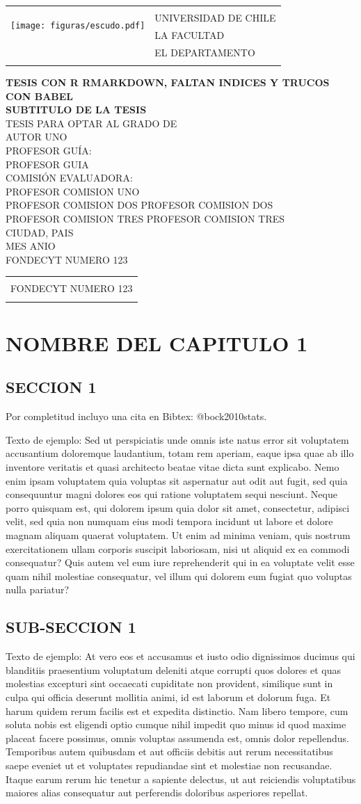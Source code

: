 \documentclass[letterpaper,10pt, openright]{report}
\title{}
\author{}
\date{}
\renewcommand{\maketitle}{%
    \thispagestyle{empty}
    \renewcommand{\baselinestretch}{1}
    \begin{center}
    \begin{tabular}{ll}
        \multirow{3}{*}{\texttt{[image: figuras/escudo.pdf]}}
        &\\
        &\large{\MakeUppercase{Universidad de Chile}}\\
        &\large{\MakeUppercase{LA FACULTAD}}\\
        &\large{\MakeUppercase{EL DEPARTAMENTO}}\\
        &\\
    \end{tabular}
    \end{center}
    \begin{center}
        \vfill
                        {\Large \bfseries \MakeUppercase{TESIS CON R RMARKDOWN, FALTAN INDICES Y TRUCOS CON BABEL}}\\
                                    {\Large  \bfseries \MakeUppercase{SUBTITULO DE LA TESIS}}\\
                    \vskip 0.75cm%
            {\large \MakeUppercase{TESIS PARA OPTAR AL GRADO DE}}\\
        \vfill
            {\large \MakeUppercase{AUTOR UNO}}\\
        \vskip 0.75cm%
            \large\MakeUppercase{Profesor Gu\'ia:}\\
            \large\MakeUppercase{PROFESOR GUIA}\\
        \vskip 0.75cm
                        \large\MakeUppercase{Comisi\'on Evaluadora:}\\
            \large\MakeUppercase{PROFESOR COMISION UNO}\\
                        \ifx PROFESOR COMISION DOS \undefined
                \vskip 0.33cm
                \vskip 11pt
            \else
                \large\MakeUppercase{PROFESOR COMISION DOS}\\
            \fi
            \ifx PROFESOR COMISION TRES \undefined
                \vskip 0.33cm
                \vskip 11pt
            \else
                \large\MakeUppercase{PROFESOR COMISION TRES}\\
            \fi
        \vfill
                \large\MakeUppercase{CIUDAD, PAIS}\\
                \large\MakeUppercase{MES ANIO}\\
        \vskip 1cm%
            \ifx FONDECYT NUMERO 123 \undefined
                {}
            \else
                \begin{footnotesize}
                    \begin{tabular}{c}
                        \hline
                        \\
                        FONDECYT NUMERO 123\\
                        \\
                        \hline
                    \end{tabular}
                \end{footnotesize}
            \fi
    \end{center}
    \newpage
}
\begin{document}
\maketitle


\hypertarget{nombre-del-capitulo-1}{%
\chapter{NOMBRE DEL CAPITULO 1}\label{nombre-del-capitulo-1}}

\hypertarget{seccion-1}{%
\section{SECCION 1}\label{seccion-1}}

Por completitud incluyo una cita en Bibtex: @bock2010stats.

Texto de ejemplo: Sed ut perspiciatis unde omnis iste natus error sit
voluptatem accusantium doloremque laudantium, totam rem aperiam, eaque
ipsa quae ab illo inventore veritatis et quasi architecto beatae vitae
dicta sunt explicabo. Nemo enim ipsam voluptatem quia voluptas sit
aspernatur aut odit aut fugit, sed quia consequuntur magni dolores eos
qui ratione voluptatem sequi nesciunt. Neque porro quisquam est, qui
dolorem ipsum quia dolor sit amet, consectetur, adipisci velit, sed quia
non numquam eius modi tempora incidunt ut labore et dolore magnam
aliquam quaerat voluptatem. Ut enim ad minima veniam, quis nostrum
exercitationem ullam corporis suscipit laboriosam, nisi ut aliquid ex ea
commodi consequatur? Quis autem vel eum iure reprehenderit qui in ea
voluptate velit esse quam nihil molestiae consequatur, vel illum qui
dolorem eum fugiat quo voluptas nulla pariatur?

\hypertarget{sub-seccion-1}{%
\section{SUB-SECCION 1}\label{sub-seccion-1}}

Texto de ejemplo: At vero eos et accusamus et iusto odio dignissimos
ducimus qui blanditiis praesentium voluptatum deleniti atque corrupti
quos dolores et quas molestias excepturi sint occaecati cupiditate non
provident, similique sunt in culpa qui officia deserunt mollitia animi,
id est laborum et dolorum fuga. Et harum quidem rerum facilis est et
expedita distinctio. Nam libero tempore, cum soluta nobis est eligendi
optio cumque nihil impedit quo minus id quod maxime placeat facere
possimus, omnis voluptas assumenda est, omnis dolor repellendus.
Temporibus autem quibusdam et aut officiis debitis aut rerum
necessitatibus saepe eveniet ut et voluptates repudiandae sint et
molestiae non recusandae. Itaque earum rerum hic tenetur a sapiente
delectus, ut aut reiciendis voluptatibus maiores alias consequatur aut
perferendis doloribus asperiores repellat.
\end{document}
